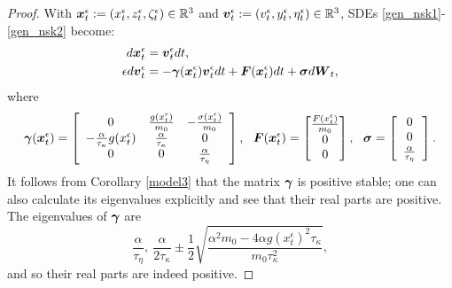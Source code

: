 \begin{proof}
With $\boldsymbol{x}^\epsilon_{t} := (x^\epsilon_{t}, z^\epsilon_{t}, \zeta^\epsilon_{t}) \in \mathbb{R}^{3}$ and $\boldsymbol{v}^\epsilon_{t} := (v^\epsilon_{t},  y^\epsilon_{t}, \eta^\epsilon_{t}) \in \mathbb{R}^{3}$, SDEs \eqref{gen_nsk1}-\eqref{gen_nsk2} become:
\begin{align}
d\boldsymbol{x}^\epsilon_{t} &= \boldsymbol{v}^\epsilon_{t} dt, \\
\epsilon  d\boldsymbol{v}^\epsilon_{t} &= - \boldsymbol{\gamma}(\boldsymbol{x}^\epsilon_{t}) \boldsymbol{v}^\epsilon_{t} dt + \boldsymbol{F}(\boldsymbol{x}^\epsilon_{t})dt + \boldsymbol{\sigma} d\boldsymbol{W}_{t},
\end{align}
where 
\begin{equation} \label{why}
\boldsymbol{\gamma}(\vecc{x}^\epsilon_{t}) = \left[ \begin{array}{ccc}
0 & \frac{g(x^\epsilon_{t})}{m_{0}} & -\frac{\sigma(x^\epsilon_{t})}{m_{0}}   \\
-\frac{\alpha}{\tau_{\kappa}} g(x^\epsilon_{t}) & \frac{\alpha}{\tau_{\kappa}} & 0 \\ 
0 & 0 & \frac{\alpha}{\tau_{\eta}} \end{array} \right], \ \ \vecc{F}(\vecc{x}^\epsilon_{t}) = \begin{bmatrix}
         \frac{F(x^\epsilon_{t})}{m_{0}} \\
         0\\
         0 \\
        \end{bmatrix}, \ \  \vecc{\sigma} = 
         \left[ \begin{array}{c}
0   \\
0  \\ 
\frac{\alpha}{\tau_{\eta}}   \end{array} \right]. \end{equation}
It follows from Corollary \ref{model3} that the matrix $\boldsymbol{\gamma}$ is positive stable; one can also calculate its eigenvalues explicitly and see that their real parts are positive. 
The eigenvalues of $\boldsymbol{\gamma}$ are 
\begin{equation} \frac{\alpha}{\tau_{\eta}}, \ \frac{\alpha}{2 \tau_{\kappa}} \pm \frac{1}{2} \sqrt{\frac{\alpha^2 m_{0}-4 \alpha g(x^\epsilon_{t})^2 \tau_{\kappa}}{m_{0} \tau_{\kappa}^2}},  \end{equation}
and so their real parts are indeed positive.


\end{proof}
